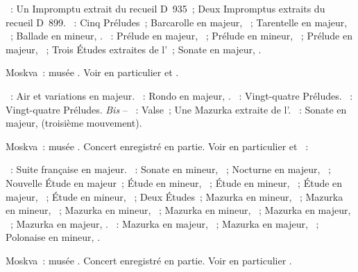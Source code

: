 \begin{description}
 \textsc{\Schubert{}}~: Un Impromptu extrait du recueil D~935~; Deux
 Impromptus extraits du recueil D~899.
 \textsc{\Chopin{}}~: Cinq Préludes~; Barcarolle en \kF \Sharp majeur,
 ~; Tarentelle en \kA \Flat majeur, ~; Ballade en \kF
 mineur, .
 \textsc{\Scriabine{}}~: Prélude en \kD \Flat majeur,  ~;
 Prélude en \kE \Flat mineur,  ~; Prélude en \kE \Flat
 majeur,  ~; Trois Études extraites de l'~;
 Sonate en \kF \Sharp majeur, .
 \item[\DateWithWeekDay{1956-10-14}]
 Moskva~: musée \Scriabine{}.
 Voir en particulier \citet[p.~449]{Milshteyn82a} et
 \citet[p.~395]{Shiryaeva}.

 \textsc{\Haendel{}}~: Air et variations en \kE majeur.
 \textsc{\Beethoven{}}~: Rondo en \kC majeur,  .
 \textsc{\Chopin{}}~: Vingt-quatre Préludes.
 \textsc{\Scriabine{}}~: Vingt-quatre Préludes.
 \emph{Bis} -- \textsc{\Scriabine{}}~: Valse~; Une Mazurka extraite de
 l'.
 \textsc{\Prokofiev{}}~: Sonate en \kB \Flat majeur,  (troisième
 mouvement).
 \item[\DateWithWeekDay{1956-12-02}]
 Moskva~: musée \Scriabine{}.
 Concert enregistré en partie.
 Voir en particulier \citet[p.~449]{Milshteyn82a} et
 \citet[p.~395]{Shiryaeva}~: 

 \textsc{\JBach{}}~: Suite française  en \kG majeur.
 \textsc{\Chopin{}}~: Sonate en \kB mineur, ~; Nocturne en \kG
 majeur,  ~; Nouvelle Étude  en \kA \Flat
 majeur~; Étude en \kE \Flat mineur,  ~; Étude en \kF
 mineur,  ~; Étude en \kF majeur,  ~;
 Étude en \kA mineur,  ~; Deux Études~; Mazurka en \kF
 mineur,  ~; Mazurka en \kC \Sharp mineur, 
 ~; Mazurka en \kG \Sharp mineur,  ~; Mazurka
 en \kC \Sharp mineur,  ~; Mazurka en \kA \Flat majeur,
  ~; Mazurka en \kB majeur,  .
 \textsc{\Scriabine{}}~: Mazurka en \kD \Flat majeur,  ~;
 Mazurka en \kF \Sharp majeur,  ~; Polonaise en \kB \Flat
 mineur, .
 \item[\DateWithWeekDay{1956-12-09}]
 Moskva~: musée \Scriabine{}.
 Concert enregistré en partie.
 Voir en particulier \citet[p.~450]{Milshteyn82a}.


\end{description}
